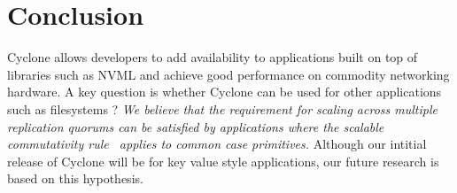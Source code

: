 \documentclass[letterpaper,twocolumn,10pt]{article}
\begin{document}
\section{Conclusion}
Cyclone allows developers to add availability to applications built on top of
libraries such as NVML and achieve good performance on commodity networking
hardware. A key question is whether Cyclone can be used for other applications
such as filesystems ? \emph{We believe that the requirement for scaling across
multiple replication quorums can be satisfied by applications where the scalable
commutativity rule~\cite{scalable_commutativity} applies to common case
primitives.} Although our intitial release of Cyclone will be for
key value style applications, our future research is based on this hypothesis.
\newcommand\myurl[2]{\url{#1}}


\end{document}

